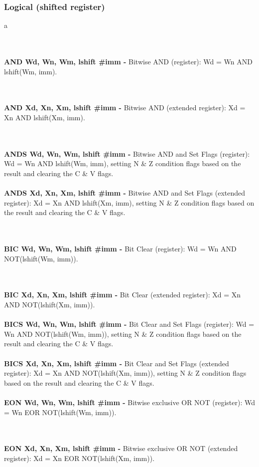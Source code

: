 \documentclass[12pt,a4paper,utf8]{ppgsi}
\begin{document}
\subsubsection{Logical (shifted register)}
a

\\\\\textbf{AND Wd, Wn, Wm{, lshift #imm} -} Bitwise AND (register): Wd = Wn AND lshift(Wm, imm). 

\\\\\textbf{AND Xd, Xn, Xm{, lshift #imm} -} Bitwise AND (extended register): Xd = Xn AND lshift(Xm, imm). 

\\\\\textbf{ANDS Wd, Wn, Wm{, lshift #imm} -} Bitwise AND and Set Flags (register): Wd = Wn AND lshift(Wm, imm), setting N \& Z condition flags
based on the result and clearing the C \& V flags. 
\\\\\textbf{ANDS Xd, Xn, Xm{, lshift #imm} -} Bitwise AND and Set Flags (extended register): Xd = Xn AND lshift(Xm, imm), setting N & Z
condition flags based on the result and clearing the C & V flags. 

\\\\\textbf{BIC Wd, Wn, Wm{, lshift #imm} -} Bit Clear (register): Wd = Wn AND NOT(lshift(Wm, imm)). 

\\\\\textbf{BIC Xd, Xn, Xm{, lshift #imm} -} Bit Clear (extended register): Xd = Xn AND NOT(lshift(Xm, imm)). 
\\\\\textbf{BICS Wd, Wn, Wm{, lshift #imm} -} Bit Clear and Set Flags (register): Wd = Wn AND NOT(lshift(Wm, imm)), setting N & Z condition
flags based on the result and clearing the C & V flags. 
\\\\\textbf{BICS Xd, Xn, Xm{, lshift #imm} -} Bit Clear and Set Flags (extended register): Xd = Xn AND NOT(lshift(Xm, imm)), setting N & Z
condition flags based on the result and clearing the C & V flags. 
\\\\\textbf{EON Wd, Wn, Wm{, lshift #imm} -} Bitwise exclusive OR NOT (register): Wd = Wn EOR NOT(lshift(Wm, imm)). 

\\\\\textbf{EON Xd, Xn, Xm{, lshift #imm} -} Bitwise exclusive OR NOT (extended register): Xd = Xn EOR NOT(lshift(Xm, imm)). 
\end{document}
